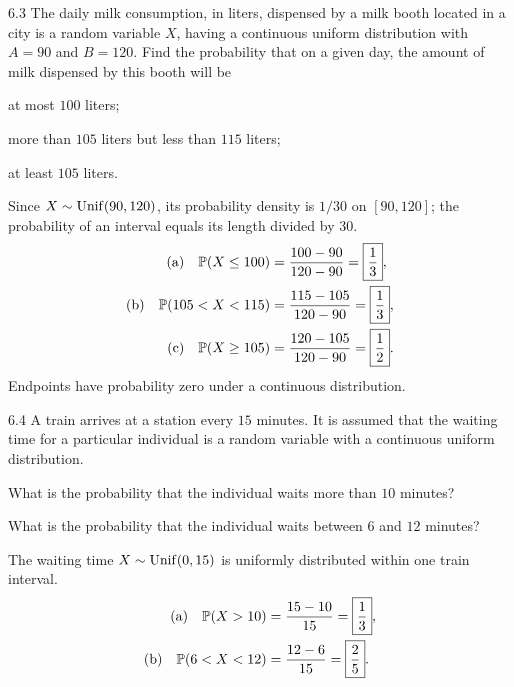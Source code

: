 \documentclass[11pt,oneside]{article}
\begin{document}
\begin{exercise}{6.3}
The daily milk consumption, in liters, dispensed by a milk booth located in a city is a random variable $X$, having a continuous uniform distribution with $A=90$ and $B=120$. Find the probability that on a given day, the amount of milk dispensed by this booth will be
\begin{exercisesubparts}
\item at most $100$ liters;
\item more than $105$ liters but less than $115$ liters;
\item at least $105$ liters.
\end{exercisesubparts}
\end{exercise}
\begin{solution}
Since $X\sim\operatorname{Unif}(90,120)$, its probability density is $1/30$ on $[90,120]$; the probability of an interval equals its length divided by $30$.
\begin{align*}
\textup{(a)}\quad\mathbb{P}(X\le100)&=\frac{100-90}{120-90}=\boxed{\frac13},\\
\textup{(b)}\quad\mathbb{P}(105<X<115)&=\frac{115-105}{120-90}=\boxed{\frac13},\\
\textup{(c)}\quad\mathbb{P}(X\ge105)&=\frac{120-105}{120-90}=\boxed{\frac12}.
\end{align*}
Endpoints have probability zero under a continuous distribution.
\end{solution}

\begin{exercise}{6.4}
A train arrives at a station every $15$ minutes. It is assumed that the waiting time for a particular individual is a random variable with a continuous uniform distribution.
\begin{exercisesubparts}
\item What is the probability that the individual waits more than $10$ minutes?
\item What is the probability that the individual waits between $6$ and $12$ minutes?
\end{exercisesubparts}
\end{exercise}
\begin{solution}
The waiting time $X\sim\operatorname{Unif}(0,15)$ is uniformly distributed within one train interval.
\begin{align*}
\textup{(a)}\quad\mathbb{P}(X>10)&=\frac{15-10}{15}=\boxed{\frac13},\\
\textup{(b)}\quad\mathbb{P}(6<X<12)&=\frac{12-6}{15}=\boxed{\frac25}.
\end{align*}
\end{solution}
\end{document}

